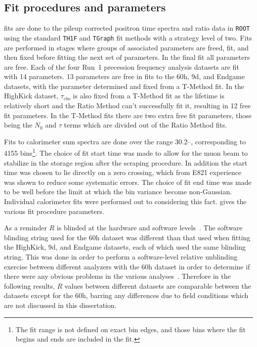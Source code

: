 \subsection{Fit procedures and parameters}


\chisq fits are done to the pileup corrected positron time spectra and ratio data in \texttt{ROOT} using the standard \texttt{TH1F} and \texttt{TGraph} fit methods with a strategy level of two. Fits are performed in stages where groups of associated parameters are freed, fit, and then fixed before fitting the next set of parameters. In the final fit all parameters are free. Each of the four Run~1 precession frequency analysis datasets are fit with 14 parameters. 13 parameters are free in fits to the 60h, 9d, and Endgame datasets, with the \K parameter determined and fixed from a T-Method fit. In the HighKick dataset, $\tau_{cbo}$ is also fixed from a T-Method fit as the lifetime is relatively short and the Ratio Method can't successfully fit it, resulting in 12 free fit parameters. In the T-Method fits there are two extra free fit parameters, those being the $N_{0}$ and $\tau$ terms which are divided out of the Ratio Method fits.

Fits to calorimeter sum spectra are done over the range 30.2--, corresponding to 4155 bins\footnote{The fit range is not defined on exact bin edges, and those bins where the fit begins and ends are included in the fit.}. The choice of fit start time was made to allow for the muon beam to stabilize in the storage region after the scraping procedure. In addition the start time was chosen to lie directly on a \gmtwo zero crossing, which from E821 experience was shown to reduce some systematic errors. The choice of fit end time was made to be well before the limit at which the bin variance become non-Gaussian. Individual calorimeter fits were performed out to  considering this fact.  gives the various fit procedure parameters.


As a reminder $R$ is blinded at the hardware and software levels~\cite{ClockManual,SoftwareBlinding}. The software blinding string used for the 60h dataset was different than that used when fitting the HighKick, 9d, and Endgame datasets, each of which used the same blinding string. This was done in order to perform a software-level relative unblinding exercise between different analyzers with the 60h dataset in order to determine if there were any obvious problems in the various analyses~\cite{BU60hReport,60hUnblinding}. Therefore in the following results, $R$ values between different datasets are comparable between the datasets except for the 60h, barring any differences due to field conditions which are not discussed in this dissertation.


